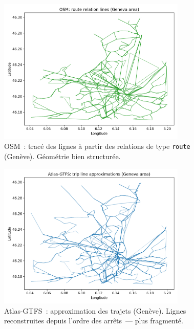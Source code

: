 \begin{figure}[H]
  \centering
  \includegraphics[width=0.8\textwidth]{../figures/chap4/geneva_osm_route_lines.png}
  \caption{OSM : tracé des lignes à partir des relations de type \texttt{route} (Genève). Géométrie bien structurée.}
\end{figure}

\begin{figure}[H]
  \centering
  \includegraphics[width=0.8\textwidth]{../figures/chap4/geneva_atlas_gtfs_trip_lines.png}
  \caption{Atlas-GTFS : approximation des trajets (Genève). Lignes reconstruites depuis l'ordre des arrêts — plus fragmenté.}
\end{figure}

